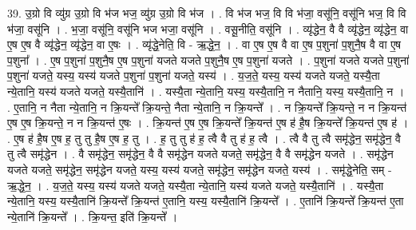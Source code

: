 \documentclass[17pt]{extarticle}
\begin{document}
39. उ॒ग्रो वि व्यु॑ग्र उ॒ग्रो वि भ॑ज भज॒ व्यु॑ग्र उ॒ग्रो वि भ॑ज । . वि भ॑ज भज॒ वि वि भ॑जा॒ वसू॑नि॒ वसू॑नि भज॒ वि वि भ॑जा॒ वसू॑नि । . भ॒जा॒ वसू॑नि॒ वसू॑नि भज भजा॒ वसू॑नि । . वसू॒नीति॒ वसू॑नि । . व्यृ॑द्धेन॒ वै वै व्यृ॑द्धेन॒ व्यृ॑द्धेन॒ वा ए॒ष ए॒ष वै व्यृ॑द्धेन॒ व्यृ॑द्धेन॒ वा ए॒षः । . व्यृ॑द्धे॒नेति॒ वि - ऋ॒द्धे॒न॒ । . वा ए॒ष ए॒ष वै वा ए॒ष प॒शुना॑ प॒शुनै॒ष वै वा ए॒ष प॒शुना᳚ । . ए॒ष प॒शुना॑ प॒शुनै॒ष ए॒ष प॒शुना॑ यजते यजते प॒शुनै॒ष ए॒ष प॒शुना॑ यजते । . प॒शुना॑ यजते यजते प॒शुना॑ प॒शुना॑ यजते॒ यस्य॒ यस्य॑ यजते प॒शुना॑ प॒शुना॑ यजते॒ यस्य॑ । . य॒ज॒ते॒ यस्य॒ यस्य॑ यजते यजते॒ यस्यै॒ता न्ये॒तानि॒ यस्य॑ यजते यजते॒ यस्यै॒तानि॑ । . यस्यै॒ता न्ये॒तानि॒ यस्य॒ यस्यै॒तानि॒ न नैतानि॒ यस्य॒ यस्यै॒तानि॒ न । . ए॒तानि॒ न नैता न्ये॒तानि॒ न क्रि॒यन्ते᳚ क्रि॒यन्ते॒ नैता न्ये॒तानि॒ न क्रि॒यन्ते᳚ । . न क्रि॒यन्ते᳚ क्रि॒यन्ते॒ न न क्रि॒यन्त॑ ए॒ष ए॒ष क्रि॒यन्ते॒ न न क्रि॒यन्त॑ ए॒षः । . क्रि॒यन्त॑ ए॒ष ए॒ष क्रि॒यन्ते᳚ क्रि॒यन्त॑ ए॒ष ह॑ है॒ष क्रि॒यन्ते᳚ क्रि॒यन्त॑ ए॒ष ह॑ । . ए॒ष ह॑ है॒ष ए॒ष ह॒ तु तु है॒ष ए॒ष ह॒ तु । . ह॒ तु तु ह॑ ह॒ त्वै वै तु ह॑ ह॒ त्वै । . त्वै वै तु त्वै समृ॑द्धेन॒ समृ॑द्धेन॒ वै तु त्वै समृ॑द्धेन । . वै समृ॑द्धेन॒ समृ॑द्धेन॒ वै वै समृ॑द्धेन यजते यजते॒ समृ॑द्धेन॒ वै वै समृ॑द्धेन यजते । . समृ॑द्धेन यजते यजते॒ समृ॑द्धेन॒ समृ॑द्धेन यजते॒ यस्य॒ यस्य॑ यजते॒ समृ॑द्धेन॒ समृ॑द्धेन यजते॒ यस्य॑ । . समृ॑द्धे॒नेति॒ सम् - ऋ॒द्धे॒न॒ । . य॒ज॒ते॒ यस्य॒ यस्य॑ यजते यजते॒ यस्यै॒ता न्ये॒तानि॒ यस्य॑ यजते यजते॒ यस्यै॒तानि॑ । . यस्यै॒ता न्ये॒तानि॒ यस्य॒ यस्यै॒तानि॑ क्रि॒यन्ते᳚ क्रि॒यन्त॑ ए॒तानि॒ यस्य॒ यस्यै॒तानि॑ क्रि॒यन्ते᳚ । . ए॒तानि॑ क्रि॒यन्ते᳚ क्रि॒यन्त॑ ए॒ता न्ये॒तानि॑ क्रि॒यन्ते᳚ । . क्रि॒यन्त॒ इति॑ क्रि॒यन्ते᳚ । \newline
\pagebreak
{}
\end{document}
